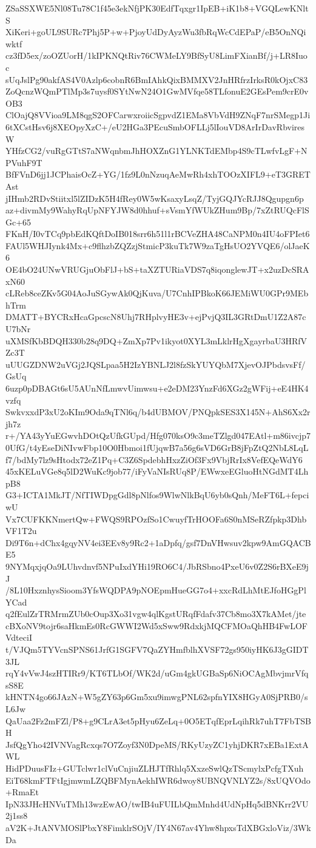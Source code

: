 ZSaSSXWE5Nl08Tu78C1f45e3ekNfjPK30EdfTqxgr1IpEB+iK1b8+VGQLewKNltS
XiKeri+goUL9SURc7Phj5P+w+PjoyUdDyAyzWu3fbRqWcCdEPaP/eB5OnNQiwktf
cz3fD5ex/zoOZUorH/1kIPKNQtRiv76CWMeLY9BfSyU8LimFXianBf/j+LR8Iuoc
sUqJslPg90akfAS4V0Azlp6cobnR6BmIAhkQixBMMXV2JnHRfrzIrksR0kOjxC83
ZoQcnzWQmPTlMp3s7uysf0SYtNwN24O1GwMVfqe58TLfonuE2GEsPem9crE0vOB3
ClOajQ8VVioa9LM8qgS2OFCarwxroiicSgpvdZ1EMa8VbVdH9ZNqF7nrSMegp1Ji
6tXCstHsv6j8XEOpyXzC+/eU2HGa3PEcuSmbOFLLj5lIouVD8ArIrDavRbviresW
YHfzCG2/vuRgGTtS7aNWqnbmJhHOXZnG1YLNKTdEMbp4S9cTLwfvLgF+NPVuhF9T
BfFVnD6jj1JCPhaisOcZ+YG/1fz9L0nNzuqAeMwRh4xhTOOzXIFL9+eT3GRETAst
jIHmb2RDvStiitxl5lZIDzK5H4fRey0W5wKsaxyLsqZ/TyjGQJYcRJJ8Qgupgn6p
az+divmMy9WahyRqUpNFYJW8d0hhuf+sVsmYfWUkZHum9Bp/7xZtRUQcFlSGc+65
FKnH/I0vTCq9pbEdKQftDoIB018srr6h51l1rBCVeZHA48CaNPM0n4IU4oFPIet6
FAUl5WHJIynk4Mx+c9flhzbZQZzjStmicP3kuTk7W9zaTgHsUO2YVQE6/olJaeK6
OE4bO24UNwVRUGjuObFlJ+bS+taXZTURiaVDS7q8iqonglewJT+x2uzDcSRAxN60
cLReb8ceZKv5G04AoJuSGywAk0QjKuva/U7CnhIPBkoK66JEMiWU0GPr9MEbhTrm
DMATT+BYCRxHcaGpcscN8Uhj7RHplvyHE3v+ejPvjQ3IL3GRtDmU1Z2A87cU7bNr
uXMSfKbBDQH330b28q9DQ+ZmXp7Pv1ikyot0XYL3mLklrHgXgayrbaU3HRfVZc3T
uUUGZDNW2uVGj2JQSLpaa5H2IzYBNLJ2l8fzSkYUYQbM7XjevOJPbdsvsFf/GsUq
6uzp0pDBAGt6sU5AUnNfLmwvUimwsu+e2eDM23YnzFd6XGz2gWFij+eE4HK4vzfq
SwkvxxdP3xU2oKIm9Oda9qTNl6q/b4dUBMOV/PNQpkSES3X145N+AhS6Xx2rjh7z
r+/YA43yYuEGwvhDOtQzUfkGUpd/Hfg070ksO9c3meTZlgd047EAtl+m86ivcjp7
0UfG/t4yEseDiNIvwFbp10O0Hbmoi1fUjqwB7a56g6sVD6GrB8jFpZtQ2NbL8LqL
f7/bdMy7lz9sHtodx72eZ1Pq+C3Z6SpdebhHxzZiOf3Fx9VbjRrIx8VefEQeWdY6
45xKELuVGe8q5lD2WuKc9job77/iFyVaNIsRUq8P/EWwxeEGluoHtNGdMT4LhpB8
G3+ICTA1MkJT/NfTIWDpgGdl8pNlfos9WlwNlkBqU6yb0sQnh/MeFT6L+fepciwU
Vx7CUFKKNmertQw+FWQS9RPOzfSo1CwuyfTrHOOFa6S0nMSeRZfpkp3DhbVF1T2u
Di9T6n+dChx4gqyNV4ei3EEv8y9Rc2+1aDpfq/gsf7DnVHwsuv2kpw9AmGQACBE5
9NYMqxjqOa9LUhvdnvf5NPuIxdYHi19RO6C4/JbRSbno4PxeU6v0Z2S6rBXeE9jJ
/8L10HxznhysSioom3YfsWQDPA9pNOEpmHueGG7o4+xxcRdLhMtEJfoHGgPlYCad
q2fEulZrTRMrmZUb0cOup3Xo31vgw4qlKgstURqfFdafv37Cb8mo3X7kAMet/jte
cBXoNV9tojr6saHkmEs0RcGWWI2Wd5xSww9RdxkjMQCFMOaQhHB4FwLOFVdteciI
t/VJQm5TYVcnSPNS61JrfG1SGFV7QaZYHmfblhXVSF72gs950iyHK6J3gGIDT3JL
rqY4vVwJ4szHTIRr9/KT6TLbOf/WK2d/uGm4gkUGBaSp6NiOCAgMbvjmrVfqsS8E
kHNTN4go66JAzN+W5gZY63p6Gm5xu9imwgPNL62spfnYIX8HGyA0SjPRB0/sL6Jw
QaUaa2Fz2mFZl/P8+g9CLrA3et5pHyu6ZeLq+0O5ETqfEprLqihRk7uhT7FbTSBH
JsfQgYho42IVNVagRcxqs7O7Zoyf3N0DpeMS/RKyUzyZC1yhjDKR7xEBa1ExtAWL
HidPDuusFIz+GUTclwr1clVuCnjiuZLHJTfRhlq5XxzeSwlQzTScmylxPcfgTXuh
EiT68kmFTFtIgjmwmLZQBFMynAekhIWR6dwoy8UBNQVNLYZ2s/8xUQVOdo+RmaEt
IpN33JHcHNVuTMh13wzEwAO/twIB4uFUILbQmMnhd4UdNpHq5dBNKrr2VU2j1ss8
aV2K+JtANVMOSlPbxY8FimklrSOjV/IY4N67av4Yhw8hpxsTdXBGxloViz/3WkDa
